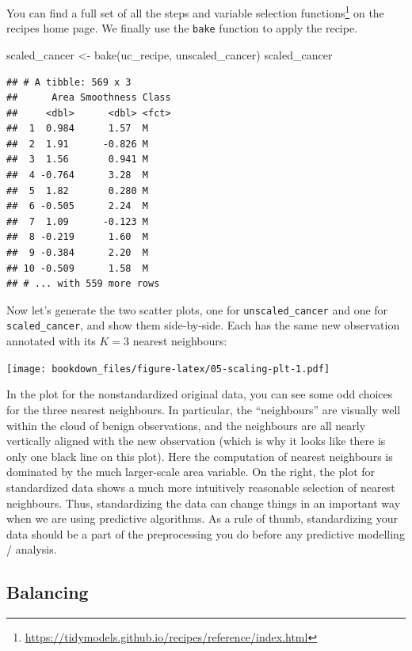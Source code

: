 \documentclass[
]{krantz}
\makeatletter
\newenvironment{Shaded}{\begin{snugshade}}{\end{snugshade}}
\newcommand{\FunctionTok}[1]{\textcolor[rgb]{0,0,0}{#1}}
\newcommand{\NormalTok}[1]{#1}
\newcommand{\OtherTok}[1]{\textcolor[rgb]{0.37,0.37,0.37}{#1}}
\renewcommand{\href}[2]{#2\footnote{\url{#1}}}
\newenvironment{kframe}{%
\medskip{}
\setlength{\fboxsep}{.8em}
 \def\at@end@of@kframe{}%
 \ifinner\ifhmode%
  \def\at@end@of@kframe{\end{minipage}}%
  \begin{minipage}{\columnwidth}%
 \fi\fi%
 \def\FrameCommand##1{\hskip\@totalleftmargin \hskip-\fboxsep
 \colorbox{shadecolor}{##1}\hskip-\fboxsep
     \hskip-\linewidth \hskip-\@totalleftmargin \hskip\columnwidth}%
 \MakeFramed {\advance\hsize-\width
   \@totalleftmargin\z@ \linewidth\hsize
   \@setminipage}}%
 {\par\unskip\endMakeFramed%
 \at@end@of@kframe}
\renewenvironment{Shaded}{\begin{kframe}}{\end{kframe}}
\makeatother
\begin{document}
You can find \href{https://tidymodels.github.io/recipes/reference/index.html}{a full set of all the steps and variable selection functions}
on the recipes home page.
We finally use the \texttt{bake} function to apply the recipe.

\begin{Shaded}
\begin{Highlighting}[]
\NormalTok{scaled\_cancer }\OtherTok{\textless{}{-}} \FunctionTok{bake}\NormalTok{(uc\_recipe, unscaled\_cancer)}
\NormalTok{scaled\_cancer}
\end{Highlighting}
\end{Shaded}

\begin{verbatim}
## # A tibble: 569 x 3
##      Area Smoothness Class
##     <dbl>      <dbl> <fct>
##  1  0.984      1.57  M    
##  2  1.91      -0.826 M    
##  3  1.56       0.941 M    
##  4 -0.764      3.28  M    
##  5  1.82       0.280 M    
##  6 -0.505      2.24  M    
##  7  1.09      -0.123 M    
##  8 -0.219      1.60  M    
##  9 -0.384      2.20  M    
## 10 -0.509      1.58  M    
## # ... with 559 more rows
\end{verbatim}

Now let's generate the two scatter plots, one for \texttt{unscaled\_cancer} and one for
\texttt{scaled\_cancer}, and show them side-by-side. Each has the same new observation
annotated with its \(K=3\) nearest neighbours:

\texttt{[image: bookdown\_files/figure-latex/05-scaling-plt-1.pdf]}

In the plot for the nonstandardized original data, you can see some odd choices
for the three nearest neighbours. In particular, the ``neighbours'' are visually
well within the cloud of benign observations, and the neighbours are all nearly
vertically aligned with the new observation (which is why it looks like there
is only one black line on this plot). Here the computation of nearest
neighbours is dominated by the much larger-scale area variable. On the right,
the plot for standardized data shows a much more intuitively reasonable
selection of nearest neighbours. Thus, standardizing the data can change things
in an important way when we are using predictive algorithms. As a rule of
thumb, standardizing your data should be a part of the preprocessing you do
before any predictive modelling / analysis.

\hypertarget{balancing}{%
\subsection{Balancing}\label{balancing}}
\end{document}

